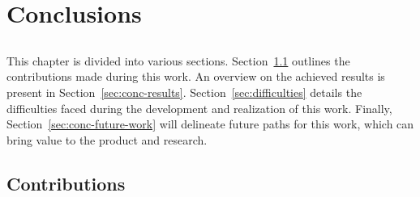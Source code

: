 \chapter{Conclusions} \label{chap:concl}

\section*{}

This chapter is divided into various sections. Section~\ref{sec:conc-contributions} outlines the contributions made during this work. An overview on the achieved results is present in Section~\ref{sec:conc-results}. Section~\ref{sec:difficulties} details the difficulties faced during the development and realization of this work. Finally, Section~\ref{sec:conc-future-work} will delineate future paths for this work, which can bring value to the product and research.

\section{Contributions} \label{sec:conc-contributions}

